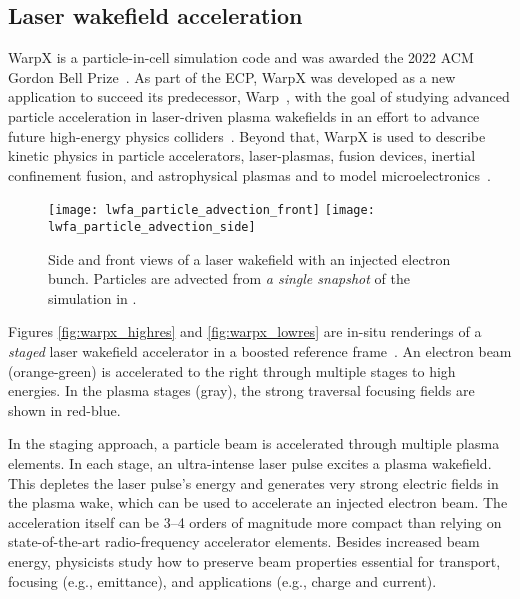 \subsection{Laser wakefield acceleration}\label{sec:warpx}

%
%
WarpX is a particle-in-cell simulation code and was awarded the 2022 ACM Gordon Bell Prize~\citep{FedeliHuebl2022}.
As part of the ECP, WarpX was developed as a new application to succeed its predecessor, Warp~\citep{Vay2013}, with the goal of studying advanced particle acceleration in laser-driven plasma wakefields in an effort to advance future high-energy physics colliders~\citep{Albert2021}.
Beyond that, WarpX is used to describe kinetic physics in particle accelerators, laser-plasmas, fusion devices, inertial confinement fusion, and astrophysical plasmas and to model microelectronics~\citep{Yao2022}.

\begin{figure*}[ht]
  \centering
  \texttt{[image: lwfa\_particle\_advection\_front]}%
  \texttt{[image: lwfa\_particle\_advection\_side]}
  \caption{Side and front views of a laser wakefield with an injected electron bunch.
  Particles are advected from \emph{a single snapshot} of the simulation in \vtkm.}
  \label{fig:lwfa_particle_advection}
\end{figure*}

Figures \ref{fig:warpx_highres} and \ref{fig:warpx_lowres} are in-situ renderings of a \emph{staged} laser wakefield accelerator in a boosted reference frame~\citep{Vay2011}.
An electron beam (orange-green) is accelerated to the right through multiple stages to high energies.
In the plasma stages (gray), the strong traversal focusing fields are shown in red-blue.

In the staging approach, a particle beam is accelerated through multiple plasma elements.
In each stage, an ultra-intense laser pulse excites a plasma wakefield.
This depletes the laser pulse's energy and generates very strong electric fields in the plasma wake, which can be used to accelerate an injected electron beam.
The acceleration itself can be 3--4 orders of magnitude more compact than relying on state-of-the-art radio-frequency accelerator elements.
Besides increased beam energy, physicists study how to preserve beam properties essential for transport, focusing (e.g., emittance), and applications (e.g., charge and current).

